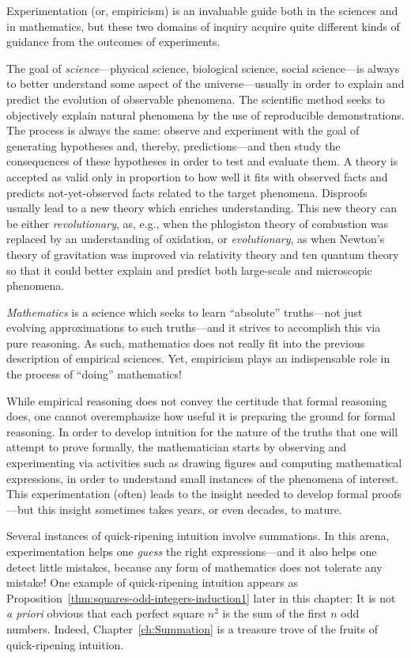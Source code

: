\noindent
Experimentation (or, empiricism) is an invaluable guide both in the sciences and in mathematics, but these two domains of inquiry acquire quite different kinds of guidance from the outcomes of experiments.

The goal of {\em science}---physical science, biological science, social science---is always to better understand some aspect of the universe---usually in order to explain and predict the evolution of observable phenomena.  The scientific method seeks to objectively explain natural phenomena by the use of reproducible demonstrations.  The process is always the same: observe and experiment with the goal of generating hypotheses and, thereby, predictions---and then study the consequences of these hypotheses in order to test and evaluate them.  A theory is accepted as valid only in proportion to how well it fits with observed facts and predicts not-yet-observed facts related to the target phenomena.  Disproofs usually lead to a new theory which enriches understanding.  This new theory can be either {\em revolutionary}, as, e.g., when the phlogiston theory of combustion was replaced by an understanding of oxidation, or {\em evolutionary}, as when Newton's theory of gravitation was improved via relativity theory and ten quantum theory so that it could better explain and predict both large-scale and microscopic phenomena.

\smallskip

{\em Mathematics} is a science which seeks to learn ``absolute'' truths---not just evolving approximations to such truths---and it strives to accomplish this via pure reasoning.  As such, mathematics does not really fit into the previous description of empirical sciences.  Yet, empiricism plays an indispensable role in the process of ``doing'' mathematics!

While empirical reasoning does not convey the certitude that formal reasoning does, one cannot overemphasize how useful it is preparing the ground for formal reasoning.  In order to develop intuition for the nature of the truths that one will attempt to prove formally, the mathematician starts by observing and experimenting via activities such as drawing figures and computing mathematical expressions, in order to understand small instances of the phenomena of interest. This experimentation (often) leads to the insight needed to develop formal proofs---but this insight sometimes takes years, or even decades, to mature.

Several instances of quick-ripening intuition involve summations.  In this arena, experimentation helps one \textit{guess} the right expressions---and it also helps one detect little mistakes, because any form of mathematics does not tolerate any mistake!  One example of quick-ripening intuition appears as Proposition~\ref{thm:squares-odd-integers-induction1} later in this
chapter: It is not {\em a priori} obvious that each perfect square $n^2$ is the sum of the first $n$ odd numbers.  Indeed, Chapter~\ref{ch:Summation} is a treasure trove of the fruits of
quick-ripening intuition.

